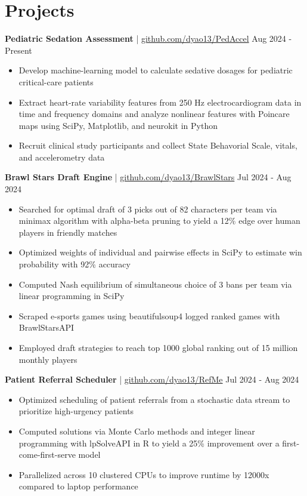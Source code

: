 \documentclass[11pt]{article}       %
\begin{document}
\vspace{-18.5pt}

\section*{Projects}
\textbf{Pediatric Sedation Assessment} | \href{https://github.com/dyao13/PedAccel}{github.com/dyao13/PedAccel} \hfill Aug 2024 - Present \vspace{-9pt} \\
\begin{itemize}
  \item Develop machine-learning model to calculate sedative dosages for pediatric critical-care patients
  \item Extract heart-rate variability features from 250 Hz electrocardiogram data in time and frequency domains and analyze nonlinear features with Poincare maps using SciPy, Matplotlib, and neurokit in Python
  \item Recruit clinical study participants and collect State Behavorial Scale, vitals, and accelerometry data
\end{itemize}

\textbf{Brawl Stars Draft Engine} | \href{https://github.com/dyao13/BrawlStars}{github.com/dyao13/BrawlStars} \hfill Jul 2024 - Aug 2024 \vspace{-9pt} \\
\begin{itemize}
  \item Searched for optimal draft of 3 picks out of 82 characters per team via minimax algorithm with alpha-beta pruning to yield a 12\% edge over human players in friendly matches
  \item Optimized weights of individual and pairwise effects in SciPy to estimate win probability with 92\% accuracy
  \item Computed Nash equilibrium of simultaneous choice of 3 bans per team via linear programming in SciPy
  \item Scraped e-sports games using beautifulsoup4 logged ranked games with BrawlStarsAPI
  \item Employed draft strategies to reach top 1000 global ranking out of 15 million monthly players
\end{itemize}

\textbf{Patient Referral Scheduler} | \href{https://github.com/dyao13/RefMe}{github.com/dyao13/RefMe} \hfill Jul 2024 - Aug 2024 \vspace{-9pt} \\
\begin{itemize}
  \item Optimized scheduling of patient referrals from a stochastic data stream to prioritize high-urgency patients 
  \item Computed solutions via Monte Carlo methods and integer linear programming with lpSolveAPI in R to yield a 25\% improvement over a first-come-first-serve model
  \item Parallelized across 10 clustered CPUs to improve runtime by 12000x compared to laptop performance
\end{itemize}
\end{document}
